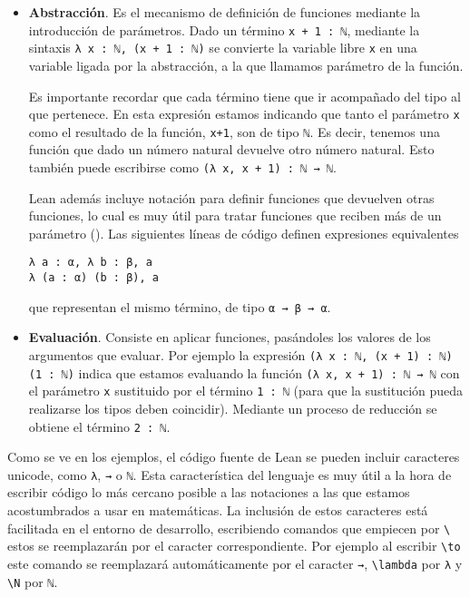 \begin{itemize}

	\item \textbf{Abstracción}. Es el mecanismo de definición de funciones mediante
	      la introducción de parámetros. Dado un término \lstinline{x + 1 : ℕ},
	      mediante la sintaxis \lstinline{λ x : ℕ, (x + 1 : ℕ)} se convierte la
	      variable libre \lstinline{x} en una variable ligada por la abstracción, a la
	      que llamamos parámetro de la función.

	      Es importante recordar que cada término tiene que ir acompañado del tipo al
	      que pertenece. En esta expresión estamos indicando que tanto el parámetro
	      \lstinline{x} como el resultado de la función, \lstinline{x+1}, son de tipo
	      \lstinline{ℕ}. Es decir, tenemos una función que dado un número natural
	      devuelve otro número natural. Esto también puede escribirse como
	      \lstinline{(λ x, x + 1) : ℕ → ℕ}.

	      Lean además incluye notación para definir funciones que devuelven otras
	      funciones, lo cual es muy útil para tratar funciones que reciben más de un
	      parámetro (). Las siguientes líneas de código
	      definen expresiones equivalentes
	      \begin{lstlisting}
λ a : α, λ b : β, a
λ (a : α) (b : β), a
\end{lstlisting}
	      que representan el mismo término, de tipo \lstinline{α → β → α}.

	\item \textbf{Evaluación}. Consiste en aplicar funciones, pasándoles los
	      valores de los argumentos que evaluar. Por ejemplo la expresión
	      \lstinline{(λ x : ℕ, (x + 1) : ℕ) (1 : ℕ)} indica que estamos evaluando la
	      función \lstinline{(λ x, x + 1) : ℕ → ℕ} con el parámetro \lstinline{x}
	      sustituido por el término \lstinline{1 : ℕ} (para que la sustitución pueda
	      realizarse los tipos deben coincidir). Mediante un proceso de
	      reducción se obtiene el término \lstinline{2 : ℕ}.

\end{itemize}


\cite{avigadLeanTheoremProver}

Como se ve en los ejemplos, el código fuente de Lean se pueden incluir
caracteres unicode, como \lstinline{λ}, \lstinline{→} o \lstinline{ℕ}. Esta
característica del lenguaje es muy útil a la hora de escribir código lo más
cercano posible a las notaciones a las que estamos acostumbrados a usar en
matemáticas. La inclusión de estos caracteres está facilitada en el entorno de
desarrollo, escribiendo comandos que empiecen por \texttt{\textbackslash} estos
se reemplazarán por el caracter correspondiente. Por ejemplo al escribir
\texttt{\textbackslash to} este comando se reemplazará automáticamente por el
caracter \lstinline{→}, \texttt{\textbackslash lambda} por \lstinline{λ} y
\texttt{\textbackslash N} por \lstinline{ℕ}.

